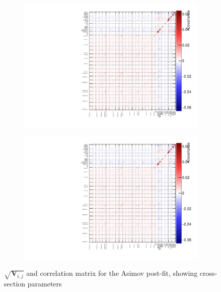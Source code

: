 \begin{figure}[h]
	\begin{subfigure}[t]{0.49\textwidth}
		\includegraphics[width=\textwidth, trim={0mm 0mm 0mm 0mm}, clip,page=11]{figures/mach3/Asimov/2017b_NewDet_NewData_Asimov_Long_0_drawCorr.pdf}
	\end{subfigure}
	\begin{subfigure}[t]{0.49\textwidth}
		\includegraphics[width=\textwidth, trim={0mm 0mm 0mm 0mm}, clip,page=12]{figures/mach3/Asimov/2017b_NewDet_NewData_Asimov_Long_0_drawCorr.pdf}
	\end{subfigure}
	\caption{$\sqrt{\mathbf{V}_{i,j}}$ and correlation matrix for the Asimov post-fit, showing cross-section parameters}
	\label{fig:asimov_xsec_corr}
\end{figure}

